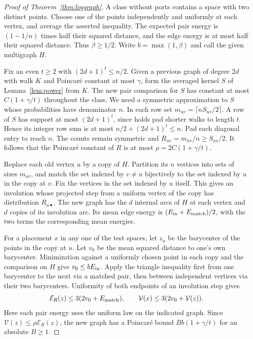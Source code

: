 \begin{proof}[Proof of Theorem~\ref{thm:loggraph}]
A class without ports contains a space with two distinct
points. Choose one of the points independently and uniformly at
each vertex, and average the asserted inequality. The expected pair
energy is \((1-1/n)\) times half their squared distance, and the edge
energy is at most half their squared distance. Thus \(\beta\ge1/2\).
Write \(b=\max(1,\beta)\) and call the given multigraph \(H\).

Fix an even \(t\ge2\) with \((2d+1)^t\le n/2\). Given a previous
graph of degree \(2d\) with walk \(K\) and Poincaré constant at most
\(\gamma\), form the averaged kernel \(S\) of Lemma~\ref{lem:power}
from \(K\). The new pair comparison for \(S\) has constant at most
\(C(1+\gamma/t)\) throughout the class.
We need a symmetric approximation to \(S\) whose probabilities have
denominator \(n\). In each row set \(m_{uv}=\lceil n S_{uv}/2\rceil\).
A row of \(S\) has support at most \((2d+1)^t\), since holds pad shorter
walks to length \(t\). Hence its integer row sum is at most
\(n/2+(2d+1)^t\le n\). Pad each diagonal entry to reach \(n\).
The counts remain symmetric and \(R_{uv}=m_{uv}/n\ge S_{uv}/2\).
It follows that the Poincaré constant of \(R\) is at most
\(\rho=2C(1+\gamma/t)\).

Replace each old vertex \(u\) by a copy of \(H\). Partition its \(n\)
vertices into sets of sizes \(m_{uv}\), and match the set indexed by
\(v\ne u\) bijectively to the set indexed by \(u\) in the copy at \(v\).
Fix the vertices in the set indexed by \(u\) itself. This gives an
involution whose projected step from a uniform vertex of the copy
has distribution \(R_{u\bullet}\).
The new graph has the \(d\) internal arcs of \(H\) at each vertex and
\(d\) copies of its involution arc. Its mean edge energy is
\((E_{\rm in}+E_{\rm match})/2\), with the two terms the corresponding
mean energies.

For a placement \(x\) in any one of the test spaces, let \(z_u\)
be the barycenter of the points in the copy at \(u\). Let \(v_0\) be
the mean squared distance to one's own barycenter. Minimization against
a uniformly chosen point in each copy and the comparison on \(H\)
give \(v_0\le b E_{\rm in}\). Apply the triangle inequality first from
one barycenter to the next via a matched pair, then between independent
vertices via their two barycenters. Uniformity of both endpoints of an
involution step gives
\[
 \mathcal E_R(z)\le3(2v_0+E_{\rm match}),\qquad
 \mathcal V(x)\le3(2v_0+\mathcal V(z)).
\]
Here each pair energy uses the uniform law on the indicated graph.
Since \(\mathcal V(z)\le\rho\mathcal E_R(z)\), the new graph has a
Poincaré bound \(B b(1+\gamma/t)\) for an absolute \(B\ge1\).


\end{proof}
